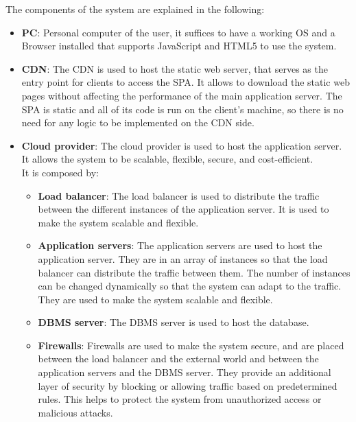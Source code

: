 The components of the system are explained in the following:
\begin{itemize}
    \item \textbf{PC}: Personal computer of the user, it suffices to have a working OS and a Browser installed that supports JavaScript and HTML5 to use the system.
    \item \textbf{CDN}: The CDN is used to host the static web server, that serves as the entry point for clients to access the SPA. 
                        It allows to download the static web pages without affecting the performance of the main application server. 
                        The SPA is static and all of its code is run on the client's machine, so there is no need for any logic to be implemented on the CDN side.
    \item \textbf{Cloud provider}: The cloud provider is used to host the application server. 
                                   It allows the system to be scalable, flexible, secure, and cost-efficient.\\
          It is composed by:
          \begin{itemize}
              \item \textbf{Load balancer}: The load balancer is used to distribute the traffic between the different instances of the application server. 
                                            It is used to make the system scalable and flexible.
              \item \textbf{Application servers}: The application servers are used to host the application server. 
                                                  They are in an array of instances so that the load balancer can distribute the traffic between them. 
                                                  The number of instances can be changed dynamically so that the system can adapt to the traffic. 
                                                  They are used to make the system scalable and flexible.
              \item \textbf{DBMS server}: The DBMS server is used to host the database.
              \item \textbf{Firewalls}: Firewalls are used to make the system secure, and are placed between the load balancer and the external world and between the application servers and the DBMS server. 
                                        They provide an additional layer of security by blocking or allowing traffic based on predetermined rules. 
                                        This helps to protect the system from unauthorized access or malicious attacks.
          \end{itemize}
\end{itemize}

